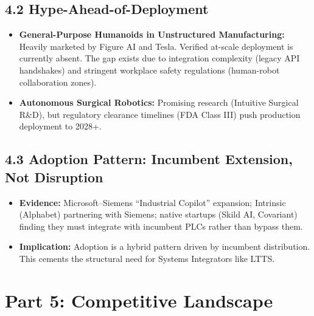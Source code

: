 \documentclass[11pt,a4paper]{article}
\begin{document}
\subsection{4.2 Hype-Ahead-of-Deployment}
\begin{itemize}
    \item \textbf{General-Purpose Humanoids in Unstructured Manufacturing:} Heavily marketed by Figure AI and Tesla. Verified at-scale deployment is currently absent. The gap exists due to integration complexity (legacy API handshakes) and stringent workplace safety regulations (human-robot collaboration zones).
    \item \textbf{Autonomous Surgical Robotics:} Promising research (Intuitive Surgical R\&D), but regulatory clearance timelines (FDA Class III) push production deployment to 2028+.
\end{itemize}

\subsection{4.3 Adoption Pattern: Incumbent Extension, Not Disruption}
\begin{itemize}
    \item \textbf{Evidence:} Microsoft--Siemens ``Industrial Copilot'' expansion; Intrinsic (Alphabet) partnering with Siemens; native startups (Skild AI, Covariant) finding they must integrate with incumbent PLCs rather than bypass them.
    \item \textbf{Implication:} Adoption is a hybrid pattern driven by incumbent distribution. This cements the structural need for Systems Integrators like LTTS.
\end{itemize}

\section{Part 5: Competitive Landscape}
\end{document}

